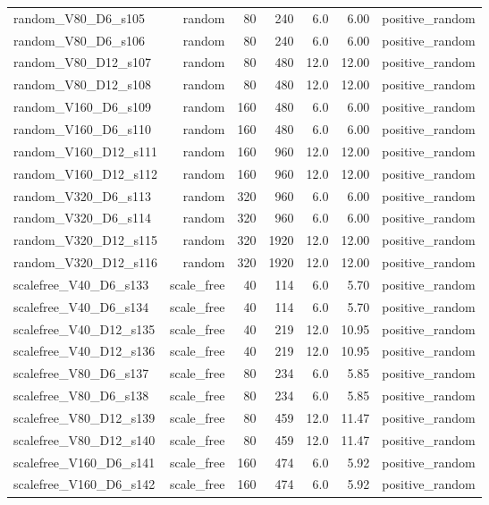 \begin{table}[htbp]
\begin{tabular}{lrrrrrr}
random\_V80\_D6\_s105 & random & 80 & 240 & 6.0 & 6.00 & positive\_random \\
random\_V80\_D6\_s106 & random & 80 & 240 & 6.0 & 6.00 & positive\_random \\
random\_V80\_D12\_s107 & random & 80 & 480 & 12.0 & 12.00 & positive\_random \\
random\_V80\_D12\_s108 & random & 80 & 480 & 12.0 & 12.00 & positive\_random \\
random\_V160\_D6\_s109 & random & 160 & 480 & 6.0 & 6.00 & positive\_random \\
random\_V160\_D6\_s110 & random & 160 & 480 & 6.0 & 6.00 & positive\_random \\
random\_V160\_D12\_s111 & random & 160 & 960 & 12.0 & 12.00 & positive\_random \\
random\_V160\_D12\_s112 & random & 160 & 960 & 12.0 & 12.00 & positive\_random \\
random\_V320\_D6\_s113 & random & 320 & 960 & 6.0 & 6.00 & positive\_random \\
random\_V320\_D6\_s114 & random & 320 & 960 & 6.0 & 6.00 & positive\_random \\
random\_V320\_D12\_s115 & random & 320 & 1920 & 12.0 & 12.00 & positive\_random \\
random\_V320\_D12\_s116 & random & 320 & 1920 & 12.0 & 12.00 & positive\_random \\
scalefree\_V40\_D6\_s133 & scale\_free & 40 & 114 & 6.0 & 5.70 & positive\_random \\
scalefree\_V40\_D6\_s134 & scale\_free & 40 & 114 & 6.0 & 5.70 & positive\_random \\
scalefree\_V40\_D12\_s135 & scale\_free & 40 & 219 & 12.0 & 10.95 & positive\_random \\
scalefree\_V40\_D12\_s136 & scale\_free & 40 & 219 & 12.0 & 10.95 & positive\_random \\
scalefree\_V80\_D6\_s137 & scale\_free & 80 & 234 & 6.0 & 5.85 & positive\_random \\
scalefree\_V80\_D6\_s138 & scale\_free & 80 & 234 & 6.0 & 5.85 & positive\_random \\
scalefree\_V80\_D12\_s139 & scale\_free & 80 & 459 & 12.0 & 11.47 & positive\_random \\
scalefree\_V80\_D12\_s140 & scale\_free & 80 & 459 & 12.0 & 11.47 & positive\_random \\
scalefree\_V160\_D6\_s141 & scale\_free & 160 & 474 & 6.0 & 5.92 & positive\_random \\
scalefree\_V160\_D6\_s142 & scale\_free & 160 & 474 & 6.0 & 5.92 & positive\_random \\

\end{tabular}
\end{table}
